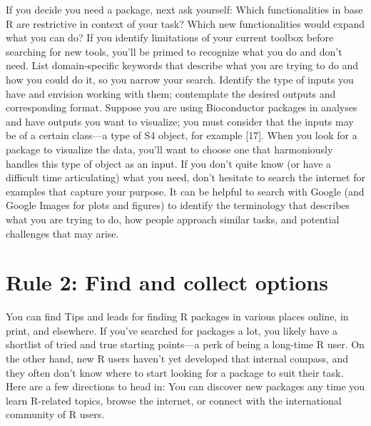 \documentclass[10pt,letterpaper]{article}
\begin{document}
If you decide you need a package, next ask yourself: Which
functionalities in base R are restrictive in context of your task? Which
new functionalities would expand what you can do? If you identify
limitations of your current toolbox before searching for new tools,
you'll be primed to recognize what you do and don't need. List
domain-specific keywords that describe what you are trying to do and how
you could do it, so you narrow your search. Identify the type of inputs
you have and envision working with them; contemplate the desired outputs
and corresponding format. Suppose you are using Bioconductor packages in
analyses and have outputs you want to visualize; you must consider that
the inputs may be of a certain class---a type of S4 object, for example
{[}17{]}. When you look for a package to visualize the data, you'll want
to choose one that harmoniously handles this type of object as an input.
If you don't quite know (or have a difficult time articulating) what you
need, don't hesitate to search the internet for examples that capture
your purpose. It can be helpful to search with Google (and Google Images
for plots and figures) to identify the terminology that describes what
you are trying to do, how people approach similar tasks, and potential
challenges that may arise.

\hypertarget{rule-2-find-and-collect-options}{%
\section{Rule 2: Find and collect
options}\label{rule-2-find-and-collect-options}}

You can find Tips and leads for finding R packages in various places
online, in print, and elsewhere. If you've searched for packages a lot,
you likely have a shortlist of tried and true starting points---a perk
of being a long-time R user. On the other hand, new R users haven't yet
developed that internal compass, and they often don't know where to
start looking for a package to suit their task. Here are a few
directions to head in: You can discover new packages any time you learn
R-related topics, browse the internet, or connect with the international
community of R users.
\end{document}
